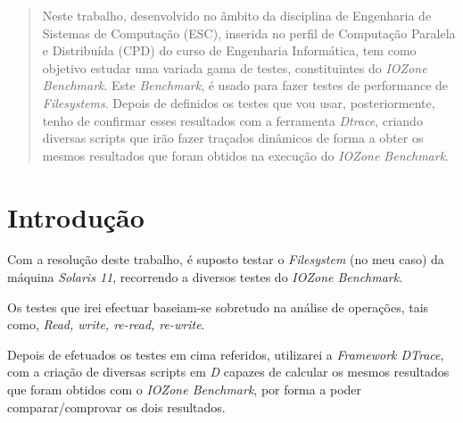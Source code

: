 \documentclass[conference,compsoc]{IEEEtran}
\begin{document}
\maketitle

\begin{abstract}
Neste trabalho, desenvolvido no âmbito da disciplina de Engenharia de Sistemas de Computação (ESC), inserida no perfil de Computação Paralela e Distribuída (CPD) do curso de Engenharia Informática, tem como objetivo estudar uma variada gama de testes, constituintes do \textit{IOZone Benchmark}. Este \textit{Benchmark}, é usado para fazer testes de performance de \textit{Filesystems}. Depois de definidos os testes que vou usar, posteriormente, tenho de confirmar esses resultados com a ferramenta \textit{Dtrace}, criando diversas scripts que irão fazer traçados dinâmicos de forma a obter os mesmos resultados que foram obtidos na execução do \textit{IOZone Benchmark}.
\end{abstract}





%
\IEEEpeerreviewmaketitle



\section{Introdução}
Com a resolução deste trabalho, é suposto testar o \textit{Filesystem} (no meu caso) da máquina \textit{Solaris 11}, recorrendo a diversos testes do \textit{IOZone Benchmark}. 

Os testes que irei efectuar baseiam-se sobretudo na análise de operações, tais como, \textit{Read, write, re-read, re-write}.

Depois de efetuados os testes em cima referidos, utilizarei a \textit{Framework DTrace}, com a criação de diversas scripts em \textit{D} capazes de calcular os mesmos resultados que foram obtidos com o \textit{IOZone Benchmark}, por forma a poder comparar/comprovar os dois resultados.
\end{document}
